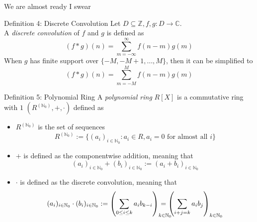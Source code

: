 \documentclass[12pt]{beamer}
\begin{document}
\begin{frame}{We are almost ready I swear}
\begin{block}{Definition 4: Discrete Convolution}
Let $D \subseteq \mathbb{Z}, f,g : D \rightarrow \mathbb{C}$.\\
A \emph{discrete convolution} of $f$ and $g$ is defined as
\[
(f * g)(n) = \sum_{m=-\infty}^\infty f(n-m) g(m)
\]
\pause
When $g$ has finite support over $\{-M,-M+1,\dots,M\}$, then it can be simplified to
\[
(f*g)(n) = \sum_{m=-M}^M f(n-m)g(m)
\]
\end{block}
\end{frame}

\begin{frame}{}
\begin{block}{Definition 5: Polynomial Ring}
A \emph{polynomial ring} $R[X]$ is a commutative ring with $1$ $(R^{(\mathbb{N}_0)}, +, \cdot)$ defined as
\begin{itemize}
\item $R^{(\mathbb{N}_0)}$ is the set of sequences
\[
R^{(\mathbb{N}_0)} := \{ (a_i)_{i \in \mathbb{N}_0} : a_i \in R, a_i = 0 \text{ for almost all } i \}
\]
\item $+$ is defined as the componentwise addition, meaning that
\[
(a_i)_{i \in \mathbb{N}_0} + (b_i)_{i \in \mathbb{N}_0} := (a_i + b_i)_{i \in \mathbb{N}_0}
\]
\item $\cdot$ is defined as the discrete convolution, meaning that
\[
(a_i)_{i \in \mathbb{N}_0} \cdot (b_i)_{i \in \mathbb{N}_0}
:= \left( \sum_{0 \leq i \leq k} a_i b_{k-i} \right)_{\mathrlap{k \in \mathbb{N}_0}}
= \left( \sum_{i+j=k} a_i b_j \right)_{k \in \mathbb{N}_0}
\]
\end{itemize}
\end{block}
\end{frame}
\end{document}
